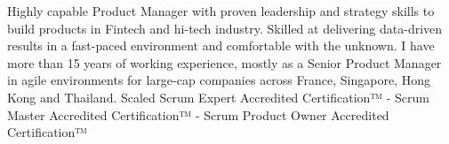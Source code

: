 

\begin{cvparagraph}


Highly capable Product Manager with proven leadership and strategy skills to build products in Fintech and hi-tech industry. Skilled at delivering data-driven results in a fast-paced environment and comfortable with the unknown. I have more than 15 years of working experience, mostly as a Senior Product Manager in agile environments for large-cap companies across France, Singapore, Hong Kong and Thailand.
\newline
Scaled Scrum Expert Accredited Certification™  -  Scrum Master Accredited Certification™  -  Scrum Product Owner Accredited Certification™

\end{cvparagraph}
